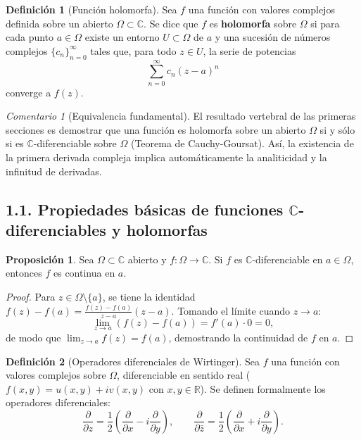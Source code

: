 \documentclass[11pt,a4paper]{article}
\theoremstyle{definition}
\newtheorem{definicion}{Definición}[section]
\newtheorem{proposicion}{Proposición}[section]
\theoremstyle{remark}
\newtheorem{observacion}{Comentario}[section]
\numberwithin{equation}{section}
\begin{document}
\begin{definicion}[Función holomorfa]
Sea $f$ una función con valores complejos definida sobre un abierto $\Omega \subset \mathbb{C}$. Se dice que $f$ es \textbf{holomorfa} sobre $\Omega$ si para cada punto $a \in \Omega$ existe un entorno $U \subset \Omega$ de $a$ y una sucesión de números complejos $\{c_n\}_{n=0}^\infty$ tales que, para todo $z \in U$, la serie de potencias
\begin{equation}
\sum_{n=0}^\infty c_n (z - a)^n
\end{equation}
converge a $f(z)$.
\end{definicion}

\begin{observacion}[Equivalencia fundamental]
El resultado vertebral de las primeras secciones es demostrar que una función es holomorfa sobre un abierto $\Omega$ si y sólo si es $\mathbb{C}$-diferenciable sobre $\Omega$ (Teorema de Cauchy-Goursat). Así, la existencia de la primera derivada compleja implica automáticamente la analiticidad y la infinitud de derivadas.
\end{observacion}

\subsection{1.1. Propiedades básicas de funciones $\mathbb{C}$-diferenciables y holomorfas}

\begin{proposicion}
Sea $\Omega \subset \mathbb{C}$ abierto y $f: \Omega \to \mathbb{C}$. Si $f$ es $\mathbb{C}$-diferenciable en $a \in \Omega$, entonces $f$ es continua en $a$.
\end{proposicion}
\begin{proof}
Para $z \in \Omega \setminus \{a\}$, se tiene la identidad $f(z) - f(a) = \frac{f(z) - f(a)}{z - a} (z - a)$. Tomando el límite cuando $z \to a$:
\[
\lim_{z \to a} (f(z) - f(a)) = f'(a) \cdot 0 = 0,
\]
de modo que $\lim_{z \to a} f(z) = f(a)$, demostrando la continuidad de $f$ en $a$.
\end{proof}

\begin{definicion}[Operadores diferenciales de Wirtinger]
Sea $f$ una función con valores complejos sobre $\Omega$, diferenciable en sentido real ($f(x,y) = u(x,y) + iv(x,y)$ con $x,y \in \mathbb{R}$). Se definen formalmente los operadores diferenciales:
\begin{equation}
\frac{\partial}{\partial z} = \frac{1}{2} \left( \frac{\partial}{\partial x} - i \frac{\partial}{\partial y} \right), \qquad \frac{\partial}{\partial \bar{z}} = \frac{1}{2} \left( \frac{\partial}{\partial x} + i \frac{\partial}{\partial y} \right).
\end{equation}
\end{definicion}
\end{document}
